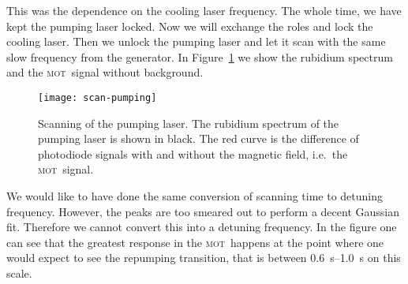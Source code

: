 \documentclass[11pt, english, fleqn, DIV=15, headinclude, BCOR=2cm]{scrreprt}
\newcommand\mot{\textsc{mot}}
\begin{document}
This was the dependence on the cooling laser frequency. The whole time, we have
kept the pumping laser locked. Now we will exchange the roles and lock the
cooling laser. Then we unlock the pumping laser and let it scan with the same
slow frequency from the generator. In Figure~\ref{fig:scan-pumping} we show the
rubidium spectrum and the \mot\ signal without background.

\begin{figure}
    \centering
    \texttt{[image: scan-pumping]}
    \caption{%
        Scanning of the pumping laser. The rubidium spectrum of the pumping
        laser is shown in black. The red curve is the difference of photodiode
        signals with and without the magnetic field, i.e.\ the \mot\ signal.
    }
    \label{fig:scan-pumping}
\end{figure}

We would like to have done the same conversion of scanning time to detuning
frequency. However, the peaks are too smeared out to perform a decent Gaussian
fit. Therefore we cannot convert this into a detuning frequency.
In the figure one can see that the greatest response in the \mot\ happens at
the point where one would expect to see the repumping transition, that is
between \SIrange{0.6}{1.0}{\second} on this scale.
\end{document}
